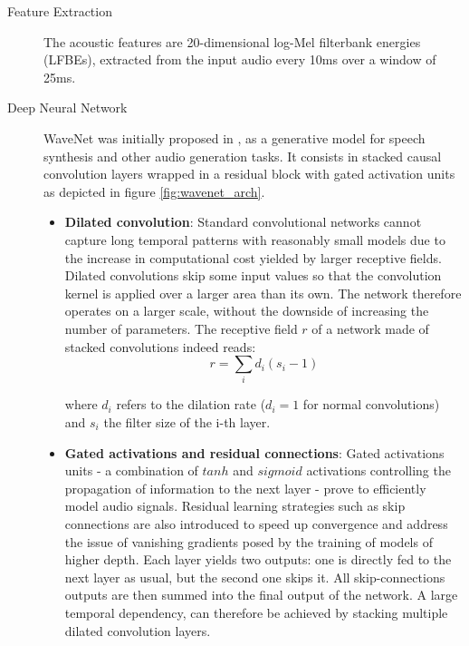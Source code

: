         \begin{description}

            \item[Feature Extraction] The acoustic features are 20-dimensional log-Mel filterbank energies (LFBEs), extracted from the input audio every 10ms over a window of 25ms.
            
            \item[Deep Neural Network] WaveNet was initially proposed in \cite{wavenet}, as a generative model for speech synthesis and other audio generation tasks.
            It consists in stacked causal convolution layers wrapped in a residual block with gated activation units as depicted in figure \ref{fig:wavenet_arch}.

            \begin{itemize}
                \item \textbf{Dilated convolution}: Standard convolutional networks cannot capture long temporal patterns with reasonably small models due to the increase in computational cost yielded by larger receptive fields. 
                Dilated convolutions skip some input values so that the convolution kernel is applied over a larger area than its own.
                The network therefore operates on a larger scale, without the downside of increasing the number of parameters. 
                The receptive field $r$ of a network made of stacked convolutions indeed reads:
                \begin{equation}
                    r = \sum_{i}{d_{i}(s_{i}-1)}
                \end{equation}

                where $d_i$ refers to the dilation rate ($d_i = 1$ for normal convolutions) and $s_i$ the filter size of the i-th layer. 

                \item \textbf{Gated activations and residual connections}: Gated activations units - a combination of $tanh$ and $sigmoid$ activations controlling the propagation of information to the next layer - prove to efficiently model audio signals.
                Residual learning strategies such as skip connections are also introduced to speed up convergence and address the issue of vanishing gradients posed by the training of models of higher depth. 
                Each layer yields two outputs: one is directly fed to the next layer as usual, but the second one skips it. 
                All skip-connections outputs are then summed into the final output of the network. 
                A large temporal dependency, can therefore be achieved by stacking multiple dilated convolution layers.
            \end{itemize}


\end{description}
